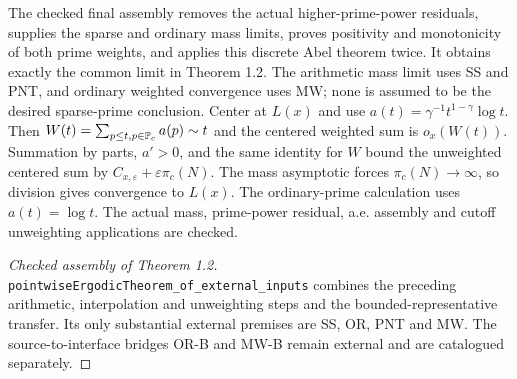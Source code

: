 The checked final assembly removes the actual higher-prime-power residuals, supplies the sparse and ordinary mass limits, proves positivity and monotonicity of both prime weights, and applies this discrete Abel theorem twice. It obtains exactly the common limit in Theorem 1.2. The arithmetic mass limit uses SS and PNT, and ordinary weighted convergence uses MW; none is assumed to be the desired sparse-prime conclusion.
\else
Center at $L(x)$ and use $a(t)=\gamma^{-1}t^{1-\gamma}\log t$. Then $W(t)=\sum_{p\leq t,p\in\mathbb P_c}a(p)\sim t$ and the centered weighted sum is $o_x(W(t))$. Summation by parts, $a'>0$, and the same identity for $W$ bound the unweighted centered sum by $C_{x,\varepsilon}+\varepsilon\pi_c(N)$. The mass asymptotic forces $\pi_c(N)\to\infty$, so division gives convergence to $L(x)$. The ordinary-prime calculation uses $a(t)=\log t$. The actual mass, prime-power residual, a.e. assembly and cutoff unweighting applications are checked.
\fi
\begin{proof}[Checked assembly of Theorem 1.2]
\leanok
\texttt{pointwiseErgodicTheorem\_\allowbreak{}of\_\allowbreak{}external\_\allowbreak{}inputs} combines the preceding arithmetic, interpolation and unweighting steps and the bounded-representative transfer. Its only substantial external premises are SS, OR, PNT and MW. The source-to-interface bridges OR-B and MW-B remain external and are catalogued separately.
\end{proof}

